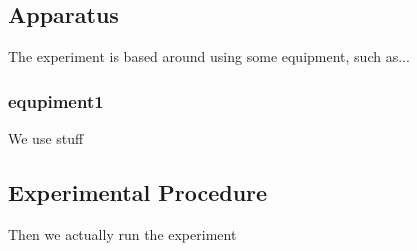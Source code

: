 \subsection{Apparatus}
The experiment is based around using some equipment, such as...

\subsubsection{equpiment1}
\label{sec:e1}
We use stuff

\subsection{Experimental Procedure}

Then we actually run the experiment